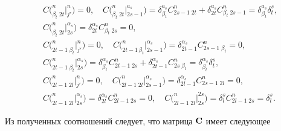 \begin{align*} 


& C\big(^n_{\beta_t\;2t} \big|^n_{j'} \big)=0, \quad  


C\big(^n_{\beta_t\;2t} \big|^{a_s}_{2s-1} \big)= 


\delta^{a_s}_{\beta_t}C^n_{2s-1\;2t}+ 


\delta^{a_s}_{2t}C^n_{\beta_t\;2s-1}=\delta^{a_s}_{\beta_t} 


\delta^s_t, \\ 


% 


& C\big(^n_{\beta_t\;2t} \big|^{\alpha_s}_{2s} \big)= 


\delta^{\alpha_s}_{2t}C^n_{\beta_t\;2s}=0, \\ 


% 


& C\big(^n_{2t-1\;\beta_t} \big|^n_{j'} \big)=0, \quad 


C\big(^n_{2t-1\,\beta_t} \big|^{\alpha_s}_{2s-1} \big)= 


\delta^{\alpha_s}_{2t-1}C^n_{2s-1\;\beta_t}=0, \\ 


% 


&C\big(^n_{2t-1\;\beta_t} \big|^{\alpha_s}_{2s} \big)= 


\delta^{\alpha_s}_{\beta_t}C^n_{2t-1\;2s}+ 


\delta^{\alpha_s}_{2t-1}C^n_{2s\;\beta_t}= 


\delta^{\alpha_s}_{\beta_t}\delta^s_t, \\ 


% 


& C\big(^n_{2l-1\;2l} \big|^n_{j'} \big)=0,\quad 


C\big(^n_{2l-1\;2l} \big|^{\alpha_s}_{2s-1} \big)= 


\delta^{\alpha_s}_{2l-1}C^n_{2s-1\;2l}=0, \\


% 


& C\big(^n_{2l-1\;2l} \big|^{\alpha_s}_{2s} \big)= 


\delta^{\alpha_s}_{2l}C^n_{2l-1\;2s}=0,\quad 


C\big(^n_{2l-1\;2l} \big|^{2s}_{2s} \big)= 


\delta^s_l C^n_{2l-1\;2s}=\delta^s_l. 


\end{align*} 


Из полученных соотношений следует, что матрица $\bold C$ имеет следующее 


